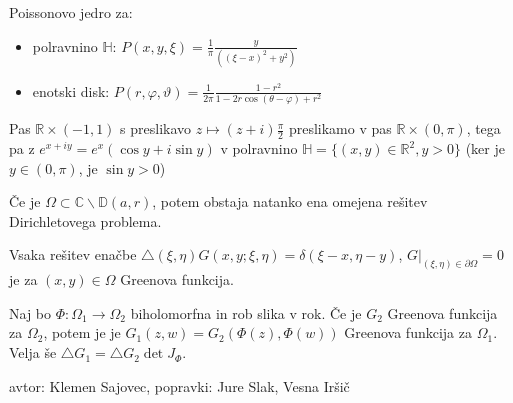 \documentclass[11pt,a4paper]{amsart}
\theoremstyle{definition} %
\theoremstyle{plain} %
\newcommand{\R}{\mathbb R}
\newcommand{\C}{\mathbb C}
\begin{document}
Poissonovo jedro za:

\begin{itemize}

\item  polravnino $\mathbb{H}$: $ P(x, y, \xi) =\frac{1}{\pi} \frac{y}{  \left((\xi -x)^2+y^2\right)}$

\item enotski disk: $P(r, \varphi, \vartheta) =\frac{1}{2 \pi}  \frac{1-r^2}{1 - 2r \cos(\theta -\varphi) +r^2}$

\end{itemize}

Pas  $\R \times (-1,1)$ s preslikavo $z \mapsto (z+i)\frac{\pi}{2}$ preslikamo v pas  $\R \times (0,\pi)$, tega pa z $e^{x+iy} = e^x(\cos y + i \sin y)$ v polravnino $\mathbb{H} = \{ (x,y) \in \R^2, y>0 \}$ (ker je $y \in (0,\pi)$, je $\sin y > 0$)

Če je $\Omega \subset \C \backslash \mathbb{D}(a,r)$, potem obstaja natanko ena omejena rešitev Dirichletovega problema.

Vsaka rešitev enačbe $\triangle (\xi, \eta) G(x,y;\xi,\eta) = \delta (\xi - x, \eta - y)$, $G|_{(\xi, \eta) \in \partial \Omega} = 0$ je za $(x,y) \in \Omega$ Greenova funkcija.

Naj bo $\Phi \colon \Omega_1 \to \Omega_2$ biholomorfna in rob slika v rok. Če je $G_2$ Greenova funkcija za $\Omega_2$, potem je je $G_1 (z, w) = G_2(\Phi(z), \Phi(w))$ Greenova funkcija za $\Omega_1$. Velja še $\triangle G_1 = \triangle G_2 \det J_{\Phi}$.


\vfill \hfill avtor: Klemen Sajovec, popravki: Jure Slak, Vesna Iršič
\end{document}
